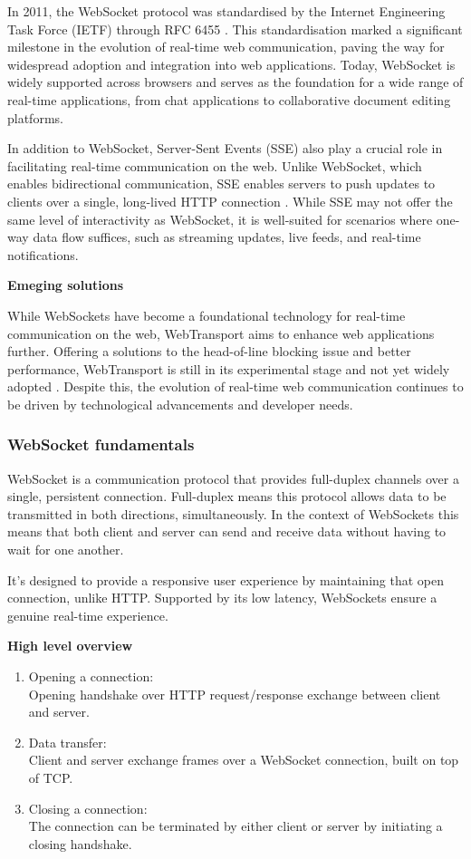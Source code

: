 In 2011, the WebSocket protocol was standardised by the Internet Engineering Task Force (IETF) through RFC 6455 \cite{mdn-ws}. This standardisation marked a significant milestone in the evolution of real-time web communication, paving the way for widespread adoption and integration into web applications. Today, WebSocket is widely supported across browsers and serves as the foundation for a wide range of real-time applications, from chat applications to collaborative document editing platforms.

In addition to WebSocket, Server-Sent Events (SSE) also play a crucial role in facilitating real-time communication on the web. Unlike WebSocket, which enables bidirectional communication, SSE enables servers to push updates to clients over a single, long-lived HTTP connection \cite{mdn-sse}. While SSE may not offer the same level of interactivity as WebSocket, it is well-suited for scenarios where one-way data flow suffices, such as streaming updates, live feeds, and real-time notifications.

\textbf{Emeging solutions}

While WebSockets have become a foundational technology for real-time communication on the web, WebTransport aims to enhance web applications further. Offering a solutions to the head-of-line blocking issue and better performance, WebTransport is still in its experimental stage and not yet widely adopted \cite{mdn-wt}. Despite this, the evolution of real-time web communication continues to be driven by technological advancements and developer needs.

\subsubsection{WebSocket fundamentals}

WebSocket is a communication protocol that provides full-duplex channels over a single, persistent connection. Full-duplex means this protocol allows data to be transmitted in both directions, simultaneously. In the context of WebSockets this means that both client and server can send and receive data without having to wait for one another.

It's designed to provide a responsive user experience by maintaining that open connection, unlike HTTP. Supported by its low latency, WebSockets ensure a genuine real-time experience. \cite{ws-rfc}

\textbf{High level overview}

\begin{enumerate}
  \item Opening a connection: \\ Opening handshake over HTTP request/response exchange between client and server.
  \item Data transfer: \\ Client and server exchange frames over a WebSocket connection, built on top of TCP.
  \item Closing a connection: \\ The connection can be terminated by either client or server by initiating a closing handshake.
\end{enumerate}

